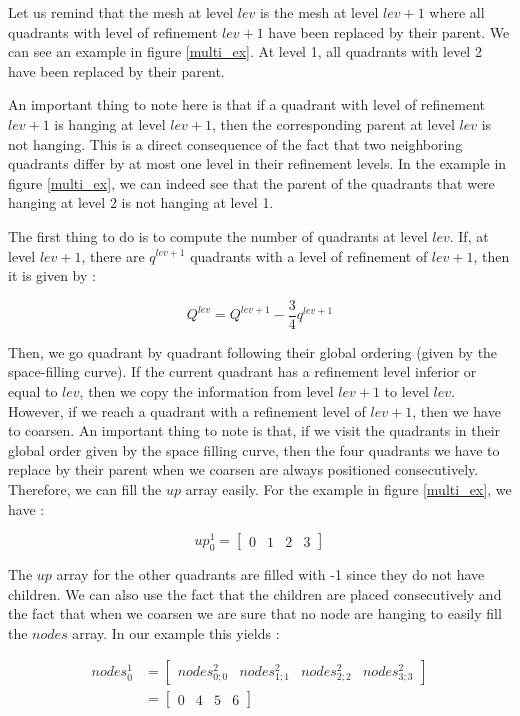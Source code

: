 Let us remind that the mesh at level $lev$ is the mesh at level $lev+1$ where all quadrants with level of refinement $lev+1$ have been replaced by their parent. We can see an example in figure \ref{multi_ex}. At level 1, all quadrants with level 2 have been replaced by their parent.

An important thing to note here is that if a quadrant with level of refinement $lev+1$ is hanging at level $lev+1$, then the corresponding parent at level $lev$ is not hanging. This is a direct consequence of the fact that two neighboring quadrants differ by at most one level in their refinement levels. In the example in figure \ref{multi_ex}, we can indeed see that the parent of the quadrants that were hanging at level 2 is not hanging at level 1.

The first thing to do is to compute the number of quadrants at level $lev$. If, at level $lev+1$, there are $q^{lev+1}$ quadrants with a level of refinement of $lev+1$, then it is given by : 

$$Q^{lev} = Q^{lev+1} - \frac{3}{4} q^{lev+1}$$

Then, we go quadrant by quadrant following their global ordering (given by the space-filling curve). If the current quadrant has a refinement level inferior or equal to $lev$, then we copy the information from level $lev+1$ to level $lev$. However, if we reach a quadrant with a refinement level of $lev+1$, then we have to coarsen. An important thing to note is that, if we visit the quadrants in their global order given by the space filling curve, then the four quadrants we have to replace by their parent when we coarsen are always positioned consecutively. Therefore, we can fill the $up$ array easily. For the example in figure \ref{multi_ex}, we have :

$$up^1_0 = \begin{bmatrix}
0 & 1 & 2 & 3
\end{bmatrix}$$

The $up$ array for the other quadrants are filled with -1 since they do not have children. We can also use the fact that the children are placed consecutively and the fact that when we coarsen we are sure that no node are hanging to easily fill the $nodes$ array. In our example this yields : 

\begin{align*}
nodes^1_0 &= \begin{bmatrix}
nodes^2_{0;0} & nodes^2_{1;1} & nodes^2_{2;2} & nodes^2_{3;3}
\end{bmatrix}\\
&= \begin{bmatrix}
0 & 4 & 5 & 6
\end{bmatrix}
\end{align*}

